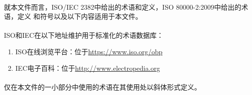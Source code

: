 \paragraph{}
就本文件而言，ISO/IEC 2382中给出的术语和定义，ISO 80000-2:2009中给出的术语，定义
和符号以及以下内容适用于本文件。

\paragraph{}
ISO和IEC在以下地址维护用于标准化的术语数据库：
\begin{enumerate}
  \item{ISO在线浏览平台：位于\href{https://www.iso.org/obp}
    {https://www.iso.org/obp}}
  \item{IEC电子百科：位于\href{http://www.electropedia.org}
    {http://www.electropedia.org}}
\end{enumerate}

\paragraph{}
仅在本文件的一小部分中使用的术语在其使用处以斜体形式定义。
